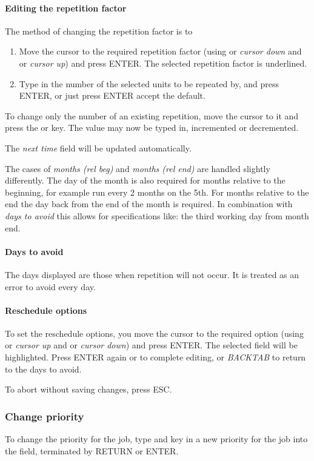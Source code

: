 \paragraph{Editing the repetition factor}
The method of changing the repetition factor is to

\begin{enumerate}
\item Move the cursor to the required repetition factor (using  or
\textit{cursor down} and  or \textit{cursor up}) and press ENTER. The
selected repetition factor is underlined.
\item Type in the number of the selected units to be repeated by, and
press ENTER, or just press ENTER accept the default.
\end{enumerate}
To change only the number of an existing repetition, move the cursor to
it and press the \userentry{+} or \userentry{{}-}
key. The value may now be typed in, incremented or decremented.

The \textit{next time} field will be updated automatically.

The cases of \textit{months (rel beg)} and \textit{months (rel end)} are
handled slightly differently. The day of the month is also required for
months relative to the beginning, for example run every 2 months on the
5th. For months relative to the end the day back from the end of the
month is required. In combination with \textit{days to avoid} this
allows for specifications like: the third working day from month end.

\paragraph{Days to avoid}
The days displayed are those when repetition will not occur. It is
treated as an error to avoid every day.

\paragraph{Reschedule options}
To set the reschedule options, you move the cursor to the required
option (using  or \textit{cursor up} and
 or \textit{cursor down}) and press ENTER. The
selected field will be highlighted. Press ENTER again or
 to complete editing, or \textit{BACKTAB} to
return to the days to avoid.

To abort without saving changes, press ESC.

\subsubsection{Change priority}
To change the priority for the job, type  and
key in a new priority for the job into the field, terminated by RETURN
or ENTER.

